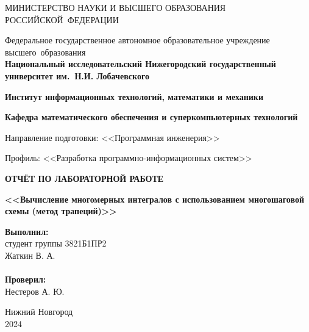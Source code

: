 \documentclass[]{article}
\theoremstyle{remark}
\theoremstyle{definition}
\begin{document}
\begin{titlepage}

\begin{center}
\MakeUppercase{Министерство науки и высшего образования Российской~Федерации}
\end{center}

\begin{center}
Федеральное государственное автономное образовательное учреждение высшего~образования \\
\textbf{Национальный исследовательский Нижегородский государственный университет им.~Н.И. Лобачевского}
\end{center}

\begin{center}
\textbf{Институт информационных технологий, математики и механики}
\end{center}
\begin{center}
\textbf{Кафедра математического обеспечения и суперкомпьютерных технологий}
\end{center}
\begin{center}
Направление подготовки: <<Программная инженерия>>
\end{center}
\begin{center}
Профиль: <<Разработка программно-информационных систем>>
\end{center}

\vspace{3em}

\begin{center}
\textbf{\Large\MakeUppercase{Отчёт по лабораторной работе}} \\
\end{center}
\begin{center}
\textbf{\Large<<Вычисление многомерных интегралов с использованием многошаговой схемы (метод трапеций)>>} \\
\end{center}

\vspace{5em}

\newbox{\lbox}
\newlength{\maxl}
\setlength{\maxl}{\wd\lbox}
\hfill\parbox{7cm}{
\hspace*{5cm}\hspace*{-5cm}\textbf{Выполнил:} \\ студент группы 	3821Б1ПР2 \\ Жаткин В. А.\\
\\

\hspace*{5cm}\hspace*{-5cm}\textbf{Проверил:} \\ Нестеров А. Ю.
}
\vspace{\fill}

\begin{center} Нижний Новгород \\ 2024 \end{center}

\end{titlepage}
\end{document}
